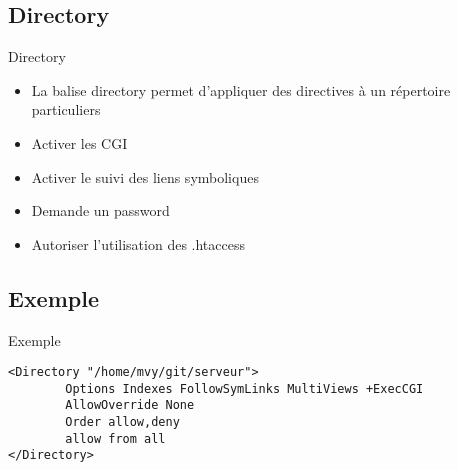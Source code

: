 \begin{frame}[containsverbatim]{\sectitle}
    \def\subsectitle{Directory}
    \subsection{\subsectitle}
    \begin{block}{\subsectitle}
        \begin{itemize}
            \item La balise directory permet d'appliquer des directives à un
                répertoire particuliers
            \item Activer les CGI
            \item Activer le suivi des liens symboliques
            \item Demande un password
            \item Autoriser l'utilisation des .htaccess
        \end{itemize}
    \end{block}
    \def\subsectitle{Exemple}
    \subsection{\subsectitle}
    \begin{exampleblock}{\subsectitle}
        \begin{verbatim}
<Directory "/home/mvy/git/serveur">
        Options Indexes FollowSymLinks MultiViews +ExecCGI
        AllowOverride None
        Order allow,deny
        allow from all
</Directory>
        \end{verbatim}
    \end{exampleblock}
\end{frame}

\def\sectitle{CGI}
